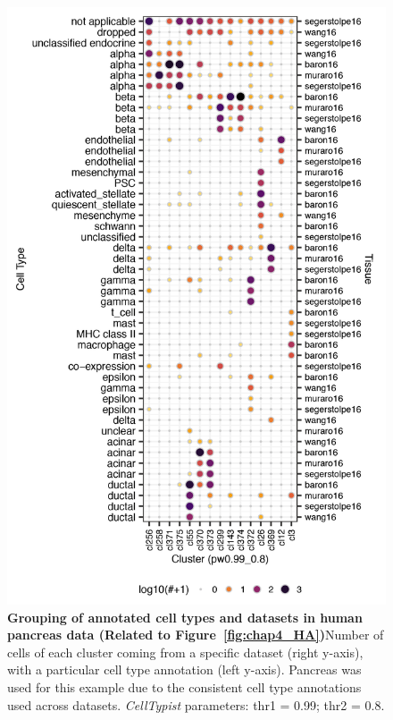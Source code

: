 \begin{figure}[ht!] 
\centering    
\includegraphics[scale=0.85]{Appendix2/Figs/appB_ctclpancreas.png} %
\caption[Grouping of annotated cell types and datasets in human pancreas data]{\textbf{Grouping of annotated cell types and datasets in human pancreas data (Related to Figure~\ref{fig:chap4_HA})}\newline Number of cells of each cluster coming from a specific dataset (right y-axis), with a particular cell type annotation (left y-axis). Pancreas was used for this example due to the consistent cell type annotations used across datasets. \textit{CellTypist} parameters: thr1 = 0.99; thr2 = 0.8.}
\label{fig:appB_panc}
\end{figure}


